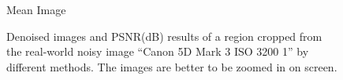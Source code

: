 \begin{figure}[t!]
{\begin{minipage}[t]{0.19\textwidth}
{\footnotesize Mean Image}
\end{minipage}
}\vspace{-3mm}
\caption{Denoised images and PSNR(dB) results of a region cropped from the real-world noisy image ``Canon 5D Mark 3 ISO 3200 1'' \cite{crosschannel2016} by different methods. The images are better to be zoomed in on screen.}
    \label{fig3-12}
\end{figure}


\begin{figure}[t!]
   \centering
{}
\end{figure}
